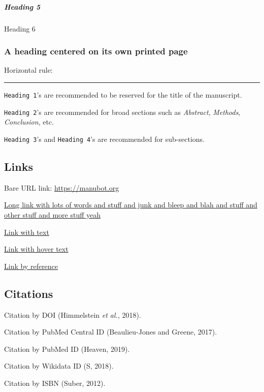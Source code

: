 \hypertarget{heading-5}{%
\subparagraph{Heading 5}\label{heading-5}}

Heading 6

\hypertarget{a-heading-centered-on-its-own-printed-page}{%
\subsubsection{A heading centered on its own printed page}\label{a-heading-centered-on-its-own-printed-page}}

Horizontal rule:

\begin{center}\rule{0.5\linewidth}{0.5pt}\end{center}

\texttt{Heading\ 1}'s are recommended to be reserved for the title of the manuscript.

\texttt{Heading\ 2}'s are recommended for broad sections such as \emph{Abstract}, \emph{Methods}, \emph{Conclusion}, etc.

\texttt{Heading\ 3}'s and \texttt{Heading\ 4}'s are recommended for sub-sections.

\hypertarget{links}{%
\subsection{Links}\label{links}}

Bare URL link: \url{https://manubot.org}

\href{https://manubot.org}{Long link with lots of words and stuff and junk and bleep and blah and stuff and other stuff and more stuff yeah}

\href{https://manubot.org}{Link with text}

\href{https://manubot.org}{Link with hover text}

\href{https://manubot.org}{Link by reference}

\hypertarget{citations}{%
\subsection{Citations}\label{citations}}

Citation by DOI (Himmelstein \emph{et al.}, 2018).

Citation by PubMed Central ID (Beaulieu-Jones and Greene, 2017).

Citation by PubMed ID (Heaven, 2019).

Citation by Wikidata ID (S, 2018).

Citation by ISBN (Suber, 2012).

